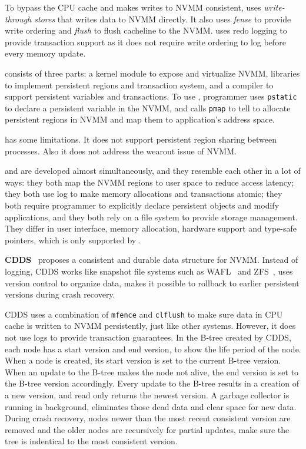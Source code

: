 To bypass the CPU cache and makes writes to NVMM consistent, \mnem{} uses
\emph{write-through stores} that writes data to NVMM directly. It also
uses \emph{fense} to provide write ordering and \emph{flush} to flush
cacheline to the NVMM. \mnem{} uses redo logging to provide transaction support
as it does not require write ordering to log before every memory update.

\mnem{} consists of three parts: a kernel module to expose and virtualize NVMM, 
libraries to implement persistent regions and transaction system, and
a compiler to support persistent variables and transactions. To use \mnem{},
programmer uses \texttt{pstatic} to declare a persistent variable in the NVMM,
and calls \texttt{pmap} to tell \mnem{} to allocate persistent regions in NVMM
and map them to application's address space.

\mnem{} has some limitations. It does not support persistent region sharing
between processes. Also it does not address the wearout issue of NVMM.

\mnem{} and \nvh{} are developed almost simultaneously, and they resemble each
other in a lot of ways: they both map the NVMM regions to user space to reduce
access latency; they both use log to make memory allocations and transactions
atomic; they both require programmer to explicitly
declare persistent objects and modify applications, and they both rely
on a file system to provide storage management. They differ in user interface,
memory allocation, hardware support and type-safe pointers, which is only
supported by \nvh{}.

\textbf{CDDS}~\cite{cdds} proposes a consistent and durable data structure for
 NVMM.
Instead of logging, CDDS works like snapshot file systems such as
WAFL~\cite{wafl} and ZFS~\cite{zfs}, uses version control to organize data,
makes it possible to rollback to earlier persistent versions during crash
recovery.

CDDS uses a combination of \texttt{mfence} and \texttt{clflush} to make sure
data in CPU cache is written to NVMM persistently, just like other systems.
However, it does not use logs to provide transaction guarantees. In the B-tree
created by CDDS, each node has a start version and end version, to show the
life period of the node. When a node is created, its start version is set
to the current B-tree version. When an update to the B-tree makes the node
not alive, the end version is set to the B-tree version accordingly.
Every update to the B-tree results in a creation of
a new version, and read only returns the newest version. A garbage collector
is running in background, eliminates those dead data and clear space for
new data. During crash recovery, nodes newer than the most recent consistent
version are removed and the older nodes are recursively for partial updates,
make sure the tree is indentical to the most consistent version.

